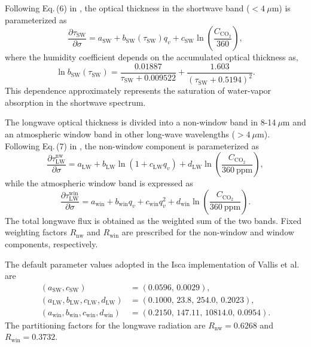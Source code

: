 Following Eq.\,(6) in \cite{Vallis2018},
the optical thickness in the shortwave band ($< 4~\mu\mathrm{m}$) is parameterized as
\begin{equation}
\frac{\partial \tau_{\mathrm{SW}}}{\partial \sigma}
= a_{\mathrm{SW}} + b_{\mathrm{SW}}(\tau_{\mathrm{SW}}) q_v
+ c_{\mathrm{SW}} \ln\!\left(\frac{C_{\mathrm{CO_2}}}{360}\right),
\label{eq:2bandLW_1bandSW_rad_tau_sw}
\end{equation}
where the humidity coefficient depends on the accumulated optical thickness as,
\begin{equation}
\ln b_{\mathrm{SW}} (\tau_{\mathrm{SW}}) = \frac{0.01887}{\tau_{\mathrm{SW}}+0.009522}
+ \frac{1.603}{(\tau_{\mathrm{SW}}+0.5194)^2}.
\label{eq:twoband_bsw}
\end{equation}
This dependence approximately represents the saturation of water-vapor absorption in the shortwave spectrum.

The longwave optical thickness is divided into a non-window band in 8-14$~\mu\mathrm{m}$ and an atmospheric window band in other long-wave wavelengths ($> 4~\mu\mathrm{m}$).
Following Eq.\,(7) in \cite{Vallis2018}, 
the non-window component is parameterized as
\begin{equation}
\frac{\partial \tau_{\mathrm{LW}}^{\mathrm{nw}}}{\partial \sigma}
=
a_{\mathrm{LW}} + b_{\mathrm{LW}} \ln\!\left(1+c_{\mathrm{LW}} q_v\right)
+ d_{\mathrm{LW}} \ln\!\left(\frac{C_{\mathrm{CO_2}}}{360~\mathrm{ppm}}\right),
\label{eq:twoband_tau_lw}
\end{equation}
while the atmospheric window band is expressed as
\begin{equation}
\frac{\partial \tau_{\mathrm{LW}}^{\mathrm{win}}}{\partial \sigma}
= a_{\mathrm{win}} + b_{\mathrm{win}} q_v + c_{\mathrm{win}} q_v^2
+ d_{\mathrm{win}} \ln\!\left(\frac{C_{\mathrm{CO_2}}}{360~\mathrm{ppm}}\right).
\label{eq:twoband_tau_window}
\end{equation}
The total longwave flux is obtained as the weighted sum of the two bands. 
Fixed weighting factors $R_{\mathrm{nw}}$ and $R_{\mathrm{win}}$ are prescribed for the non-window and window components, respectively.

The default parameter values adopted in the Isca implementation of Vallis et al.~\cite{Vallis2018} are 
\begin{align}
(a_{\mathrm{SW}}, c_{\mathrm{SW}}) &= (0.0596,\,0.0029), \\
(a_{\mathrm{LW}}, b_{\mathrm{LW}}, c_{\mathrm{LW}}, d_{\mathrm{LW}}) &= (0.1000,\,23.8,\,254.0,\,0.2023), \\
(a_{\mathrm{win}}, b_{\mathrm{win}}, c_{\mathrm{win}}, d_{\mathrm{win}}) &= (0.2150,\,147.11,\,10814.0,\,0.0954).
\end{align}
The partitioning factors for the longwave radiation are
$R_{\mathrm{nw}}=0.6268$ and $R_{\mathrm{win}}=0.3732$.


